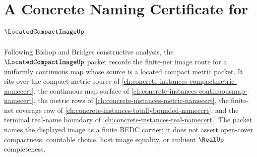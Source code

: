 \chapter{A Concrete Naming Certificate for $\LocatedCompactImageUp$}
\label{ch:concrete-instances-located-compact-image-namecert}

Following Bishop and Bridges constructive analysis, the $\LocatedCompactImageUp$ packet records the finite-net image route for a uniformly continuous map whose source is a located compact metric packet. It sits over the compact metric source of \autoref{ch:concrete-instances-compactmetric-namecert}, the continuous-map surface of \autoref{ch:concrete-instances-continuousmap-namecert}, the metric rows of \autoref{ch:concrete-instances-metric-namecert}, the finite-net coverage row of \autoref{ch:concrete-instances-totallybounded-namecert}, and the terminal real-name boundary of \autoref{ch:concrete-instances-real-namecert}. The packet names the displayed image as a finite BEDC carrier; it does not assert open-cover compactness, countable choice, host image equality, or ambient $\RealUp$ completeness.

